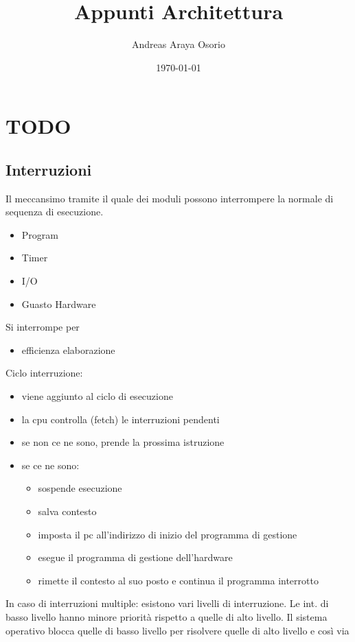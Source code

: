 \documentclass[12pt, a4paper]{article}
\title{Appunti Architettura}
\author{Andreas Araya Osorio}
\date{\today}
\begin{document}
\maketitle


\section{ TODO }
\subsection{Interruzioni}
Il meccansimo tramite il quale dei moduli possono interrompere la normale di sequenza di esecuzione. \newline

\begin{itemize}
	\item Program
	\item Timer
	\item I/O
	\item Guasto Hardware
	\end{itemize}
Si interrompe per
\begin{itemize}
	\item efficienza elaborazione
\end{itemize}

Ciclo interruzione:
\begin{itemize}
	\item viene aggiunto al ciclo di esecuzione
	\item la cpu controlla (fetch) le interruzioni pendenti
	\item se non ce ne sono, prende la prossima istruzione
	\item se ce ne sono: 
	\begin{itemize}
		\item sospende esecuzione
		\item salva contesto
		\item imposta il pc all'indirizzo di inizio del programma di gestione
		\item esegue il programma di gestione dell'hardware
		\item rimette il contesto al suo posto e continua il programma interrotto
	\end{itemize}
\end{itemize}
In caso di interruzioni multiple: esistono vari livelli di interruzione. Le int. di basso livello hanno minore priorità rispetto a quelle di alto livello. 
Il sistema operativo blocca quelle di basso livello per risolvere quelle di alto livello e così via
\end{document}
